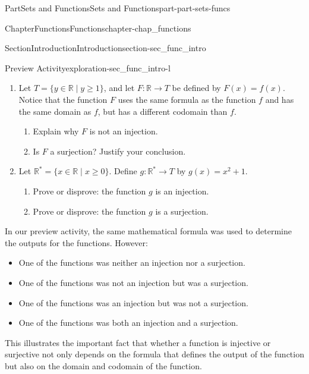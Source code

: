 \documentclass[oneside,10pt,]{book}
\numberwithin{equation}{chapter}
\newcommand{\R}{\mathbb{R}}
\begin{document}
\begin{partptx}{Part}{Sets and Functions}{}{Sets and Functions}{}{}{part-part-sets-funcs}
\begin{chapterptx}{Chapter}{Functions}{}{Functions}{}{}{chapter-chap_functions}
\begin{sectionptx}{Section}{Introduction}{}{Introduction}{}{}{section-sec_func_intro}
\begin{exploration}{Preview Activity}{}{exploration-sec_func_intro-l}
\begin{enumerate}[font=\bfseries,label=(\alph*),ref=\alph*]
\begin{enumerate}[font=\bfseries,label=(\roman*),ref=\theenumi.\roman*]%
\item{}Show that \(h\) is an injection.%
\item{}Is \(h\) a surjection? Justify your conclusion.%
\end{enumerate}%
\item{}Let \(T = \{y \in \R \mid y \geq 1\}\), and let \(F: \R \to T\) be defined by \(F(x) = f(x)\). Notice that the function \(F\) uses the same formula as the function \(f\) and has the same domain as \(f\), but has a different codomain than \(f\).%
\begin{enumerate}[font=\bfseries,label=(\roman*),ref=\theenumi.\roman*]%
\item{}Explain why \(F\) is not an injection.%
\item{}Is \(F\) a surjection? Justify your conclusion.%
\end{enumerate}%
\item{}Let \(\R^*= \{x \in \R \mid x \geq 0\}\). Define \(g : \R^* \to T\) by \(g(x) = x^2 + 1\).%
\begin{enumerate}[font=\bfseries,label=(\roman*),ref=\theenumi.\roman*]%
\item{}Prove or disprove: the function \(g\) is an injection.%
\item{}Prove or disprove: the function \(g\) is a surjection.%
\end{enumerate}%
\end{enumerate}%
\end{exploration}%
In our preview activity, the same mathematical formula was used to determine the outputs for the functions. However:%
\begin{itemize}[label=\textbullet]
\item{}One of the functions was neither an injection nor a surjection.%
\item{}One of the functions was not an injection but was a surjection.%
\item{}One of the functions was an injection but was not a surjection.%
\item{}One of the functions was both an injection and a surjection.%
\end{itemize}
%
\par
This illustrates the important fact that whether a function is injective or surjective not only depends on the formula that defines the output of the function but also on the domain and codomain of the function.%
\par

\end{sectionptx}
\end{chapterptx}
\end{partptx}
\end{document}
